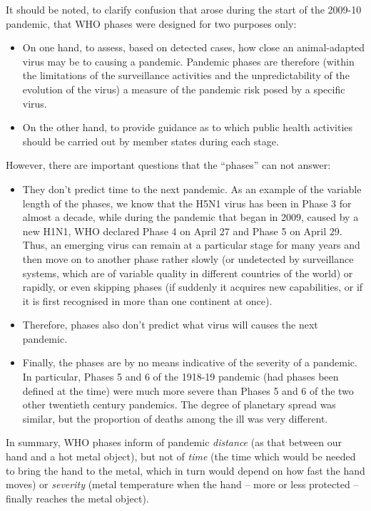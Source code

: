 \documentclass[12pt, a4]{scrartcl}
\begin{document}
It should be noted, to clarify confusion that arose during the start of the 2009-10 pandemic, that WHO phases were designed for two purposes only:

\begin{itemize}
	\item On one hand, to assess, based on detected cases, how close an animal-adapted virus may be to causing a pandemic. Pandemic phases are therefore (within the limitations of the surveillance activities and the unpredictability of the evolution of the virus) a measure of the pandemic risk posed by a specific virus.
	\item On the other hand, to provide guidance as to which public health activities should be carried out
by member states during each stage.
\end{itemize}

However, there are important questions that the “phases” can not answer:

\begin{itemize}
	\item They don't predict time to the next pandemic. As an example of the variable length of the phases, we know that the H5N1 virus has been in Phase 3 for almost a decade, while during the pandemic that began in 2009, caused by a new H1N1, WHO declared Phase 4 on April 27 and Phase 5 on April 29. Thus, an emerging virus can remain at a particular stage for many years and then move on to another phase rather slowly (or undetected by surveillance systems, which are of variable quality in different countries of the world) or rapidly, or even skipping phases (if suddenly it acquires new capabilities, or if it is first recognised in more than one continent at once).
	\item Therefore, phases also don't predict what virus will causes the next pandemic.
	\item Finally, the phases are by no means indicative of the severity of a pandemic. In particular, Phases 5 and 6 of the 1918-19 pandemic (had phases been defined at the time) were much more severe than Phases 5 and 6 of the two other twentieth century pandemics. The degree of planetary spread was similar, but the proportion of deaths among the ill was very different.
\end{itemize}

In summary, WHO phases inform of pandemic \emph{distance} (as that between our hand and a hot metal object), but not of \emph{time} (the time which would be needed to bring the hand to the metal, which in turn would depend on how fast the hand moves) or \emph{severity} (metal temperature when the hand – more or less protected – finally reaches the metal object).
\end{document}

